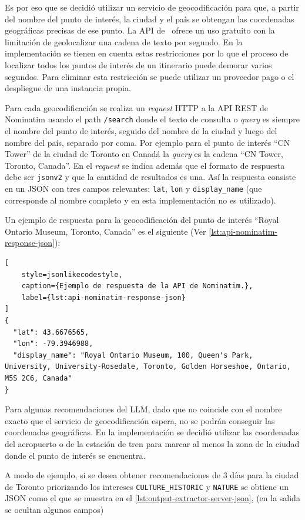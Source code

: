 Es por eso que se decidió utilizar un servicio de geocodificación para que, a partir del nombre del punto de interés, la
ciudad y el país se obtengan las coordenadas geográficas precisas de ese punto.
La API de~\cite{nominatim-api-overview} ofrece un uso gratuito con
la limitación de geolocalizar una cadena de texto por segundo.
En la implementación se tienen en cuenta estas restricciones por lo que el proceso de localizar todos los puntos de
interés de un itinerario puede demorar varios segundos.
Para eliminar esta restricción se puede utilizar un proveedor pago o el despliegue de una instancia propia.

Para cada geocodificación se realiza un \textit{request} HTTP a la API REST de Nominatim usando el path
\texttt{/search} donde el texto de consulta o \textit{query} es siempre el nombre del punto de interés, seguido del
nombre de la ciudad y luego del nombre del país, separado por coma.
Por ejemplo para el punto de interés ``CN Tower'' de la ciudad de Toronto en Canadá la \textit{query} es la cadena
``CN Tower, Toronto, Canada''.
En el \textit{request} se indica además que el formato de respuesta debe ser \texttt{jsonv2} y que la cantidad de
resultados es una.
Así la respuesta consiste en un JSON con tres campos relevantes: \texttt{lat}, \texttt{lon} y \texttt{display\_name}
(que corresponde al nombre completo y en esta implementación no es utilizado).

Un ejemplo de respuesta para la geocodificación del punto de interés ``Royal Ontario Museum, Toronto, Canada'' es el
siguiente (Ver \autoref{lst:api-nominatim-response-json}):

\begin{lstlisting}[
    style=jsonlikecodestyle,
    caption={Ejemplo de respuesta de la API de Nominatim.},
    label={lst:api-nominatim-response-json}
]
{
  "lat": 43.6676565,
  "lon": -79.3946988,
  "display_name": "Royal Ontario Museum, 100, Queen's Park, University, University-Rosedale, Toronto, Golden Horseshoe, Ontario, M5S 2C6, Canada"
}
\end{lstlisting}

Para algunas recomendaciones del LLM, dado que no coincide con el nombre exacto que el servicio de
geocodificación espera, no se podrán conseguir las coordenadas geográficas.
En la implementación se decidió utilizar las coordenadas del aeropuerto o de la estación de tren para marcar al menos la
zona de la ciudad donde el punto de interés se encuentra.

A modo de ejemplo, si se desea obtener recomendaciones de 3 días para la ciudad de Toronto priorizando los intereses
\texttt{CULTURE\_HISTORIC} y \texttt{NATURE} se obtiene un JSON como el que se muestra en el
\autoref{lst:output-extractor-server-json}, (en la salida se ocultan algunos campos)

